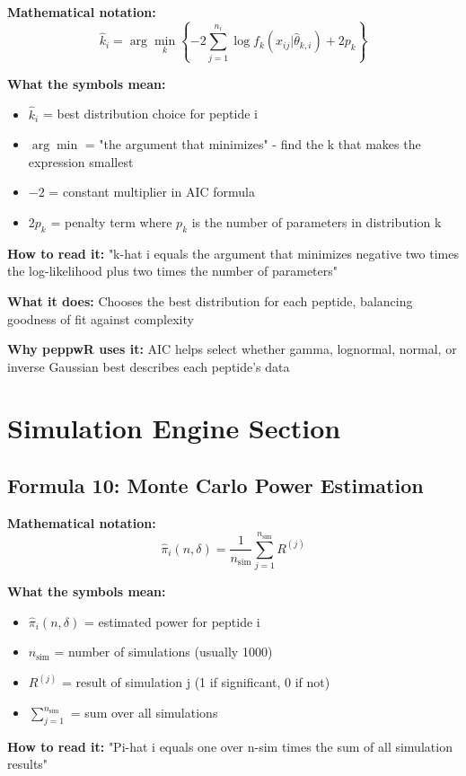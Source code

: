 \documentclass[11pt]{article}
\begin{document}
\textbf{Mathematical notation:}
\[\hat{k}_i = \arg\min_k \left\{-2 \sum_{j=1}^{n_i} \log f_k(x_{ij} | \hat{\theta}_{k,i}) + 2p_k\right\}\]

\textbf{What the symbols mean:}
\begin{itemize}
\item $\hat{k}_i$ = best distribution choice for peptide i
\item $\arg\min$ = "the argument that minimizes" - find the k that makes the expression smallest
\item $-2$ = constant multiplier in AIC formula
\item $2p_k$ = penalty term where $p_k$ is the number of parameters in distribution k
\end{itemize}

\textbf{How to read it:} "k-hat i equals the argument that minimizes negative two times the log-likelihood plus two times the number of parameters"

\textbf{What it does:} Chooses the best distribution for each peptide, balancing goodness of fit against complexity

\textbf{Why peppwR uses it:} AIC helps select whether gamma, lognormal, normal, or inverse Gaussian best describes each peptide's data

\section{Simulation Engine Section}

\subsection{Formula 10: Monte Carlo Power Estimation}

\textbf{Mathematical notation:}
\[\hat{\pi}_i(n, \delta) = \frac{1}{n_{\text{sim}}} \sum_{j=1}^{n_{\text{sim}}} R^{(j)}\]

\textbf{What the symbols mean:}
\begin{itemize}
\item $\hat{\pi}_i(n, \delta)$ = estimated power for peptide i
\item $n_{\text{sim}}$ = number of simulations (usually 1000)
\item $R^{(j)}$ = result of simulation j (1 if significant, 0 if not)
\item $\sum_{j=1}^{n_{\text{sim}}}$ = sum over all simulations
\end{itemize}

\textbf{How to read it:} "Pi-hat i equals one over n-sim times the sum of all simulation results"
\end{document}

